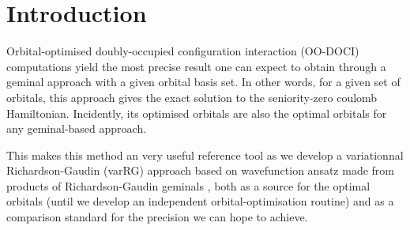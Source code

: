 \documentclass[twoside,twocolumn,9pt]{article}
\begin{document}
\renewcommand*\rmdefault{bch}\normalfont\upshape
\rmfamily
\section*{}
\vspace{-1cm}







\section{Introduction}

Orbital-optimised doubly-occupied configuration interaction (OO-DOCI) computations yield the most precise result one can expect to obtain through a geminal approach with a given orbital basis set. In other words, for a given set of orbitals, this approach gives the exact solution to the seniority-zero coulomb Hamiltonian. Incidently, its optimised orbitals are also the optimal orbitals for any geminal-based approach.

This makes this method an very useful reference tool as we develop a variationnal Richardson-Gaudin (varRG) approach based on wavefunction ansatz made from products of Richardson-Gaudin geminals\cite{Johnson:2}\cite{Fecteau:2}
, both as a source for the optimal orbitals (until we develop an independent orbital-optimisation routine) and as a comparison standard for the precision we can hope to achieve.
\end{document}
